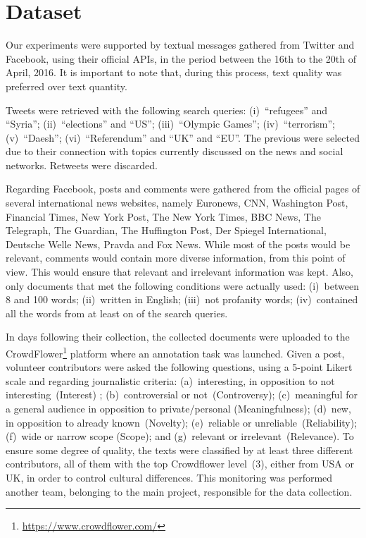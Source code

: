 \section{Dataset}

Our experiments were supported by textual messages gathered from Twitter and Facebook, using their official APIs, in the period between the 16th to the 20th of April, 2016.
It is important to note that, during this process, text quality was preferred over text quantity.

Tweets were retrieved with the following search queries: (i)~``refugees'' and ``Syria''; (ii)~``elections'' and ``US''; (iii)~``Olympic Games''; (iv)~``terrorism''; (v)~``Daesh''; (vi)~``Referendum'' and ``UK'' and ``EU''.
The previous were selected due to their connection with topics currently discussed on the news and social networks.
Retweets were discarded.

Regarding Facebook, posts and comments were gathered from the official pages of several international news websites, namely Euronews, CNN, Washington Post, Financial Times, New York Post, The New York Times, BBC News, The Telegraph, The Guardian, The Huffington Post, Der Spiegel International, Deutsche Welle News, Pravda and Fox News.
While most of the posts would be relevant, comments would contain more diverse information, from this point of view. This would ensure that relevant and irrelevant information was kept.
Also, only documents that met the following conditions were actually used: (i)~between 8 and 100 words; (ii)~written in English; (iii)~not profanity words; (iv)~contained all the words from at least on of the search queries.

In days following their collection, the collected documents were uploaded to the CrowdFlower\footnote{\url{https://www.crowdflower.com/}} platform where an annotation task was launched.
Given a post, volunteer contributors were asked the following questions, using a 5-point Likert scale and regarding journalistic criteria:
(a)~interesting, in opposition to not interesting~(Interest) ; (b)~controversial or not~(Controversy); (c)~meaningful for a general audience in opposition to private/personal (Meaningfulness); (d)~new, in opposition to already known~(Novelty); (e)~reliable or unreliable~(Reliability); (f)~wide or narrow scope (Scope); and (g)~relevant or irrelevant~(Relevance).
To ensure some degree of quality, the texts were classified by at least three different contributors, all of them with the top Crowdflower level~(3), either from USA or UK, in order to control cultural differences. This monitoring was performed another team, belonging to the main project, responsible for the data collection.

